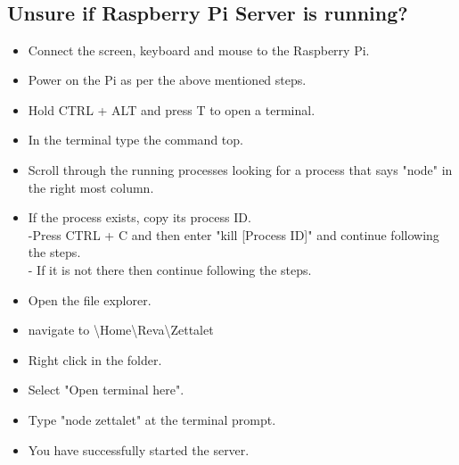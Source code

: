 	\subsection*{\\Unsure if Raspberry Pi Server is running?\\}
	
			\begin{itemize}
			\item Connect the screen, keyboard and mouse to the Raspberry Pi.
			\item Power on the Pi as per the above mentioned steps.
			\item Hold CTRL + ALT and press T to open a terminal.
			\item In the terminal type the command top.
			\item Scroll through the running processes looking for a process that says "node" in the right most column.
			\item If the process exists, copy its process ID.\\
				-Press CTRL + C and then enter "kill [Process ID]" and continue following the steps. \\ - If it is not there then continue following the steps.
			\item Open the file explorer.
			\item navigate to \textbackslash Home\textbackslash Reva\textbackslash Zettalet
			\item Right click in the folder.
			\item Select "Open terminal here".
			\item Type "node zettalet" at the terminal prompt.
			\item You have successfully started the server.
		\end{itemize}

